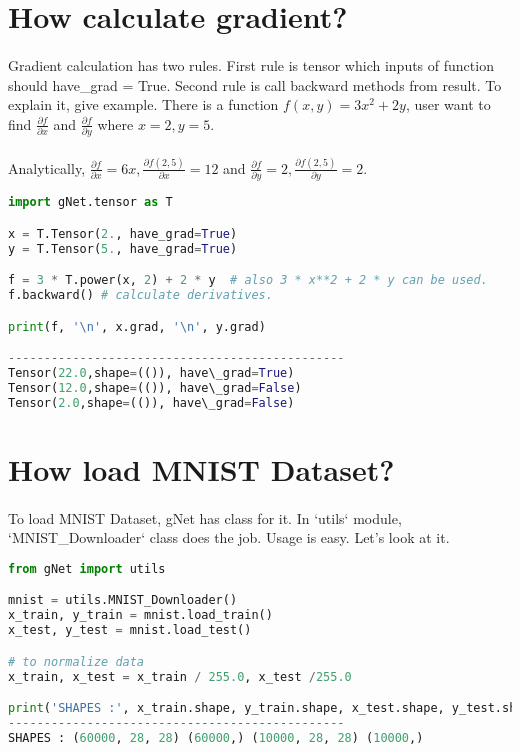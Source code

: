 \documentclass[12pt]{report}
\begin{document}
\section{How calculate gradient?}
\paragraph{}
Gradient calculation has two rules. First rule is tensor which inputs of function should have\_grad = True. Second rule is call backward methods from result. To explain it, give example. There is a function $f(x,y) = 3x^2 + 2y$, user want to find $\frac{\partial f}{\partial x}$ and $\frac{\partial f}{\partial y}$ where $x=2, y=5$. 

\paragraph{}
Analytically, $\frac{\partial f}{\partial x} = 6x, \frac{\partial f(2,5)}{\partial x} = 12$ and  $\frac{\partial f}{\partial y} = 2, \frac{\partial f(2,5)}{\partial y} = 2$. 

\begin{lstlisting}[language=Python, numbers=none, caption={Calculation of gradient.}, label={ex:grad-calc}]
import gNet.tensor as T

x = T.Tensor(2., have_grad=True)
y = T.Tensor(5., have_grad=True)

f = 3 * T.power(x, 2) + 2 * y  # also 3 * x**2 + 2 * y can be used.
f.backward() # calculate derivatives. 

print(f, '\n', x.grad, '\n', y.grad)

-----------------------------------------------
Tensor(22.0,shape=(()), have\_grad=True) 
Tensor(12.0,shape=(()), have\_grad=False)
Tensor(2.0,shape=(()), have\_grad=False)
\end{lstlisting}



\section{How load MNIST Dataset?}
\paragraph{}
To load MNIST Dataset, gNet has class for it. In `utils` module, `MNIST\_Downloader` class does the job. Usage is easy. Let's look at it.

\begin{lstlisting}[language=Python, numbers=none, caption={Load MNIST Dataset.}, label={ex:mnist-load}]
from gNet import utils

mnist = utils.MNIST_Downloader()
x_train, y_train = mnist.load_train()
x_test, y_test = mnist.load_test()

# to normalize data
x_train, x_test = x_train / 255.0, x_test /255.0

print('SHAPES :', x_train.shape, y_train.shape, x_test.shape, y_test.shape)
-----------------------------------------------
SHAPES : (60000, 28, 28) (60000,) (10000, 28, 28) (10000,)
\end{lstlisting}
\end{document}
